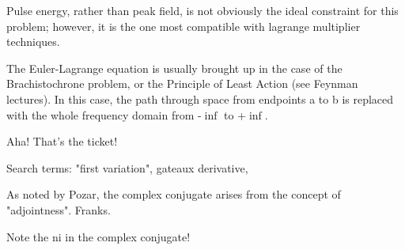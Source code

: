 \documentclass[paper.tex]{subfiles}
\begin{document}
	

	


Pulse energy, rather than peak field, is not obviously the ideal constraint for this problem; however, it is the one most compatible with lagrange multiplier techniques.

The Euler-Lagrange equation is usually brought up in the case of the Brachistochrone problem, or the Principle of Least Action (see Feynman lectures). In this case, the path through space from endpoints a to b is replaced with the whole frequency domain from -$\inf$ to +$\inf$.

Aha! That's the ticket! 

Search terms: "first variation", gateaux derivative, 

As noted by Pozar, the complex conjugate arises from the concept of "adjointness". Franks.

Note the ni in the complex conjugate!
\end{document}
